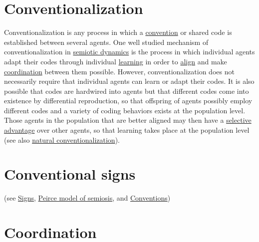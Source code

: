 \documentclass[12pt]{article}
\begin{document}
\hypertarget{conventionalization}{}
\section{Conventionalization}

Conventionalization is any process in which a
\hyperlink{convention}{convention} or shared code is established
between several agents. One well studied mechanism of
conventionalization in \hyperlink{semiotic_dynamics}{semiotic
  dynamics} is the process in which individual agents adapt their
codes through individual \hyperlink{learning}{learning} in order to
\hyperlink{alignment}{align} and make
\hyperlink{coordination}{coordination} between them possible. However,
conventionalization does not necessarily require that individual
agents can learn or adapt their codes. It is also possible that codes
are hardwired into agents but that different codes come into existence
by differential reproduction, so that offspring of agents possibly
employ different codes and a variety of coding behaviors exists at the
population level. Those agents in the population that are better
aligned may then have a \hyperlink{selection}{selective advantage}
over other agents, so that learning takes place at the population
level (see also \hyperlink{natural_conventionalization}{natural
  conventionalization}).

\section{Conventional signs} (see \hyperlink{signs}{Signs}, \hyperlink{peirce_model_of_semiosis}{Peirce model of semiosis}, and \hyperlink{convention}{Conventions})

\hypertarget{coordination}{}
\section{Coordination}
\end{document}
